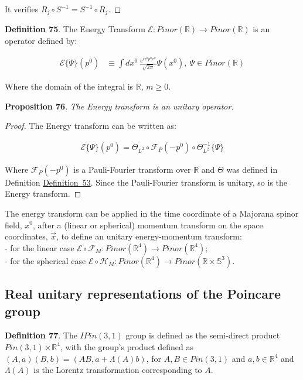 \documentclass[11pt]{book}
\begin{document}
It verifies \(R_j\circ S^{-1}=S^{-1}\circ R_j\).~◻

\textbf{Definition 75}. The Energy Transform
\(\mathcal{E}: Pinor(\mathbb{R})\to
Pinor(\mathbb{R})\) is an operator defined by:

\begin{equation}\begin{aligned}
\mathcal{E}\{\Psi\}(p^0)&\equiv \int dx^0\ \frac{e^{i\gamma^0p^0x^0}}{\sqrt{2\pi}}\Psi(x^0),\ \Psi\in Pinor(\mathbb{R})\end{aligned}\end{equation}

Where the domain of the integral is \(\mathbb{R}\), \(m\geq 0\).

\textbf{Proposition 76}. \emph{The Energy transform is an unitary
operator.}

\emph{Proof.} The Energy transform can be written as:

\begin{equation}\begin{aligned}
\mathcal{E}\{\Psi\}(p^0)=\Theta_{L^2}\circ
\mathcal{F}_P(-p^0)\circ\Theta^{-1}_{L^2}\{\Psi\}\end{aligned}\end{equation}

Where \(\mathcal{F}_P(-p^0)\) is a Pauli-Fourier transform over
\(\mathbb{R}\) and \(\Theta\) was defined in Definition
\protect\hyperlink{defn:Theta}{Definition~53}. Since the Pauli-Fourier
transform is unitary, so is the Energy transform.~◻

The energy transform can be applied in the time coordinate of a Majorana
spinor field, \(x^0\), after a (linear or spherical) momentum transform
on the space coordinates, \(\vec{x}\), to define an unitary
energy-momentum transform:\\
- for the linear case \(\mathcal{E}\circ
\mathcal{F}_M:Pinor(\mathbb{R}^4)\to Pinor(\mathbb{R}^4)\);\\
- for the spherical case \(\mathcal{E}\circ
\mathcal{H}_M:Pinor(\mathbb{R}^4)\to Pinor(\mathbb{R}\times
\mathbb{S}^3)\).

\hypertarget{real-unitary-representations-of-the-poincare-group}{%
\subsection{Real unitary representations of the Poincare
group}\label{real-unitary-representations-of-the-poincare-group}}

\textbf{Definition 77}. The \(IPin(3,1)\) group is defined as the
semi-direct product \(Pin(3,1)\ltimes \mathbb{R}^4\), with the group's
product defined as \((A,a)(B,b)=(AB,a+\Lambda(A)b)\), for
\(A,B\in Pin(3,1)\) and \(a,b\in \mathbb{R}^4\) and \(\Lambda(A)\) is
the Lorentz transformation corresponding to \(A\).
\end{document}
